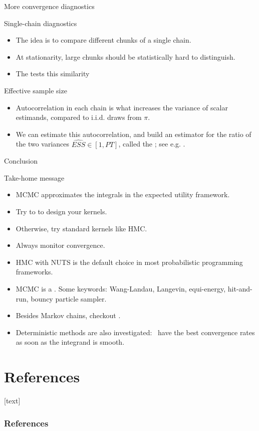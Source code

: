 \documentclass[10pt]{beamer}
\begin{document}
\begin{frame}{More convergence diagnostics}
\begin{block}{Single-chain diagnostics}
  \begin{itemize}
  \item The idea is to compare different chunks of a single chain.
  \item At stationarity, large chunks should be statistically hard to distinguish.
  \item The  tests this similarity \citep{Gew04}
  \end{itemize}
\end{block}

\begin{block}{Effective sample size}
  \begin{itemize}
  \item Autocorrelation in each chain is what increases the variance of scalar estimands, compared to i.i.d. draws from $\pi$.
  \item We can estimate this autocorrelation, and build an estimator for the ratio of the two variances $\widehat{ESS}\in [1,PT]$, called the ; see e.g. \citep[Section 11.5]{GCSDVR13}.
  \end{itemize}
\end{block}
\end{frame}


\begin{frame}{Conclusion}
\begin{block}{Take-home message}
  \begin{itemize}
    \item MCMC approximates the integrals in the expected utility framework.
    \item Try to  to design your kernels.
    \item Otherwise, try standard kernels like HMC.
    \item Always monitor convergence.
  \end{itemize}
\end{block}

  \begin{itemize}
  \item HMC with NUTS is the default choice in most probabilistic programming frameworks.
  \item MCMC is a . Some keywords: Wang-Landau, Langevin, equi-energy, hit-and-run, bouncy particle sampler.
  \item Besides Markov chains, checkout  \citep{DeDoJa06}.
  \item Deterministic methods are also investigated:  \citep{DiPi10} have the best convergence rates as soon as the integrand is smooth.
\end{itemize}
\end{frame}


\section*{References}
[text]%
\begin{frame}[allowframebreaks]
\frametitle{References}
\small
\printbibliography
\normalsize
\end{frame}
\end{document}
